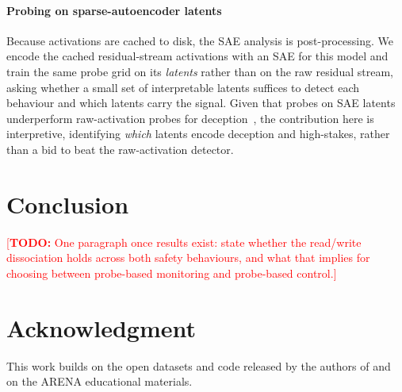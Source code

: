 \documentclass[conference]{IEEEtran}
\newcommand{\TODO}[1]{\textcolor{red}{[\textbf{TODO:} #1]}}
\begin{document}
\paragraph{Probing on sparse-autoencoder latents}
Because activations are cached to disk, the SAE analysis is post-processing. We
encode the cached residual-stream activations with an SAE for this model and
train the same probe grid on its \emph{latents} rather than on the raw residual
stream, asking whether a small set of interpretable latents suffices to detect
each behaviour and which latents carry the signal. Given that probes on SAE
latents underperform raw-activation probes for deception~\cite{goldowsky2025},
the contribution here is interpretive, identifying \emph{which} latents encode
deception and high-stakes, rather than a bid to beat the raw-activation
detector.

\section{Conclusion}
\TODO{One paragraph once results exist: state whether the read/write
dissociation holds across both safety behaviours, and what that implies for
choosing between probe-based monitoring and probe-based control.}

\section*{Acknowledgment}
This work builds on the open datasets and code released by the authors of
\cite{marks2024,goldowsky2025,mckenzie2025,rimsky2024} and on the ARENA
educational materials.
\end{document}
